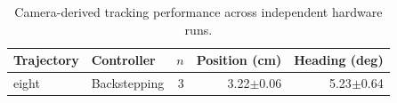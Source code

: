 \begin{table}[!t]
\centering
\caption{Camera-derived tracking performance across independent hardware runs.}
\label{tab:tracking}
\begin{tabular}{llrrr}
\hline
Trajectory & Controller & $n$ & Position (cm) & Heading (deg) \\
\hline
eight & Backstepping & 3 & 3.22$\pm$0.06 & 5.23$\pm$0.64 \\
\hline
\end{tabular}
\end{table}
